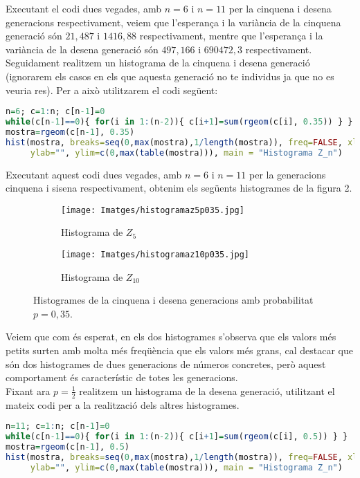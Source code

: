 \documentclass[11pt,a4paper]{article}
\begin{document}
Executant el codi dues vegades, amb $n=6$ i $n=11$ per la cinquena i desena generacions respectivament, veiem que l'esperança i la variància de la cinquena generació són $21,487$ i $1416,88$ respectivament, mentre que l'esperança i la variància de la desena generació són $497,166$ i $690472,3$ respectivament.
Seguidament realitzem un histograma de la cinquena i desena generació (ignorarem els casos en els que aquesta generació no te individus ja que no es veuria res). Per a això utilitzarem el codi següent:
\begin{center}
  \begin{lstlisting}[language=R, caption={Histograma de la cinquena i desena generació amb p=0,35},xleftmargin=.0\textwidth,xrightmargin=.0\textwidth]
n=6; c=1:n; c[n-1]=0
while(c[n-1]==0){ for(i in 1:(n-2)){ c[i+1]=sum(rgeom(c[i], 0.35)) } }
mostra=rgeom(c[n-1], 0.35)
hist(mostra, breaks=seq(0,max(mostra),1/length(mostra)), freq=FALSE, xlab="", 
     ylab="", ylim=c(0,max(table(mostra))), main = "Histograma Z_n")
\end{lstlisting}
\end{center}
Executant aquest codi dues vegades, amb $n=6$ i $n=11$ per la generacions cinquena i sisena respectivament, obtenim els següents histogrames de la figura 2.\\
\begin{figure}[ht]
  \centering
  \begin{subfigure}[b]{0.49\textwidth}
    \centering
    \texttt{[image: Imatges/histogramaz5p035.jpg]}
    \caption{Histograma de $Z_{5}$}
  \end{subfigure}
  \hfill
  \begin{subfigure}[b]{0.49\textwidth}
    \centering
    \texttt{[image: Imatges/histogramaz10p035.jpg]}
    \caption{Histograma de $Z_{10}$}
  \end{subfigure}
  \caption{Histogrames de la cinquena i desena generacions amb probabilitat $p=0,35$.}
\end{figure}
Veiem que com és esperat, en els dos histogrames s'observa que els valors més petits surten amb molta més freqüència que els valors més grans, cal destacar que són dos histogrames de dues generacions de números concretes, però aquest comportament és característic de totes les generacions.\\
Fixant ara $p=\frac{1}{2}$ realitzem un histograma de la desena generació, utilitzant el mateix codi per a la realització dels altres histogrames.
\newpage
\begin{center}
  \begin{lstlisting}[language=R, caption={Histograma de la desena generació amb probabilitat p=0,5},xleftmargin=.0\textwidth,xrightmargin=.0\textwidth]
n=11; c=1:n; c[n-1]=0
while(c[n-1]==0){ for(i in 1:(n-2)){ c[i+1]=sum(rgeom(c[i], 0.5)) } }
mostra=rgeom(c[n-1], 0.5)
hist(mostra, breaks=seq(0,max(mostra),1/length(mostra)), freq=FALSE, xlab="", 
     ylab="", ylim=c(0,max(table(mostra))), main = "Histograma Z_n")
\end{lstlisting}
\end{center}
\end{document}
